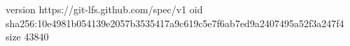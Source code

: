 version https://git-lfs.github.com/spec/v1
oid sha256:10e4981b054139e2057b3535417a9c619c5e7f6ab7ed9a2407495a52f3a247f4
size 43840
